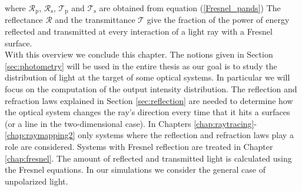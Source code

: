 where $\mathcal{R}_\textrm{p}$, $\mathcal{R}_\textrm{s}$, $\mathcal{T}_\textrm{p}$ and $\mathcal{T}_\textrm{s}$ are obtained from equation (\ref{Fresnel_pands})
The reflectance $\mathcal{R}$ and the transmittance $\mathcal{T}$ give the fraction of the power of energy reflected and transmitted at every interaction of a light ray with a Fresnel surface.
 \\
\indent With this overview we conclude this chapter. The notions given in Section \ref{sec:photometry} will be used in the entire thesis as our goal is to study the distribution of light at the target of some optical systems. In particular we will focus on the computation of the output intensity distribution. The reflection and refraction laws explained in Section \ref{sec:reflection} are needed to determine how the optical system changes the ray's direction every time that it hits a surfaces (or a line in the two-dimensional case). In Chapters \ref{chap:raytracing}-\ref{chap:raymapping2} only systems where the reflection and refraction laws play a role are considered. Systems with Fresnel reflection are treated in Chapter \ref{chap:fresnel}. The amount of reflected and transmitted light is calculated using the Fresnel equations. In our simulations we consider the general case of unpolarized light. 
